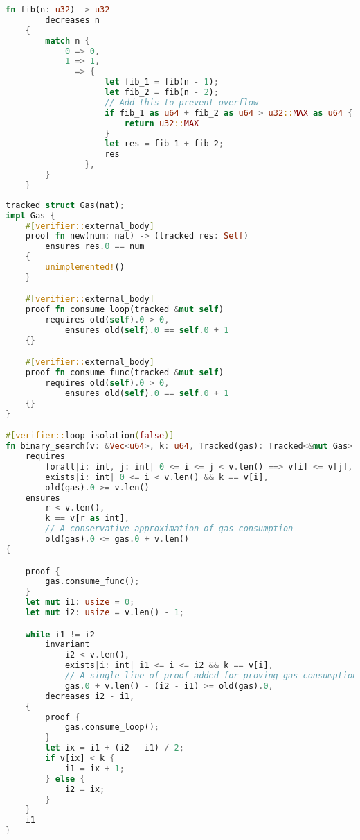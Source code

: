 \documentclass[conference]{IEEEtran}
\begin{document}
\begin{lstlisting}[language=Rust,style=colouredRust, caption={decreases example}, label = {6}]
    fn fib(n: u32) -> u32 
        decreases n 
    {
        match n {
            0 => 0,
            1 => 1,
            _ => {
                    let fib_1 = fib(n - 1); 
                    let fib_2 = fib(n - 2);
                    // Add this to prevent overflow
                    if fib_1 as u64 + fib_2 as u64 > u32::MAX as u64 {
                        return u32::MAX
                    }
                    let res = fib_1 + fib_2;
                    res
                },
        }
    }
\end{lstlisting}

\begin{lstlisting}[language=Rust,style=colouredRust, caption={Linear Ghost Type for Tracking Complexity}, label = {7}]
tracked struct Gas(nat);
impl Gas {
    #[verifier::external_body]
    proof fn new(num: nat) -> (tracked res: Self) 
        ensures res.0 == num
    {
        unimplemented!()
    }

    #[verifier::external_body]
    proof fn consume_loop(tracked &mut self)
        requires old(self).0 > 0,
            ensures old(self).0 == self.0 + 1
    {}

    #[verifier::external_body]
    proof fn consume_func(tracked &mut self)
        requires old(self).0 > 0,
            ensures old(self).0 == self.0 + 1
    {}
}

#[verifier::loop_isolation(false)]
fn binary_search(v: &Vec<u64>, k: u64, Tracked(gas): Tracked<&mut Gas>) -> (r: usize)
    requires
        forall|i: int, j: int| 0 <= i <= j < v.len() ==> v[i] <= v[j],
        exists|i: int| 0 <= i < v.len() && k == v[i],
        old(gas).0 >= v.len()
    ensures
        r < v.len(),
        k == v[r as int],
        // A conservative approximation of gas consumption
        old(gas).0 <= gas.0 + v.len()
{

    proof {
        gas.consume_func();
    }
    let mut i1: usize = 0;
    let mut i2: usize = v.len() - 1;

    while i1 != i2
        invariant
            i2 < v.len(),
            exists|i: int| i1 <= i <= i2 && k == v[i],
            // A single line of proof added for proving gas consumption
            gas.0 + v.len() - (i2 - i1) >= old(gas).0,
        decreases i2 - i1,
    {
        proof {
            gas.consume_loop();
        }
        let ix = i1 + (i2 - i1) / 2;
        if v[ix] < k {
            i1 = ix + 1;
        } else {
            i2 = ix;
        }
    }
    i1
}
\end{lstlisting}
\end{document}
